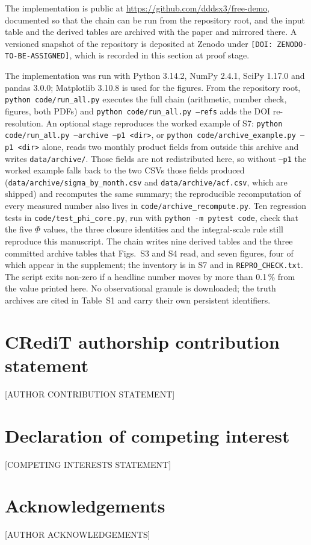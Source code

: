 \documentclass[preprint,12pt,authoryear]{elsarticle}
\begin{document}
{\sloppy The implementation is public at
\url{https://github.com/dddsx3/free-demo}, documented so that the chain can be run
from the repository root, and the input table and the derived tables are archived with the paper and mirrored there. A versioned snapshot of the repository is deposited at Zenodo under
\texttt{[DOI: ZENODO-TO-BE-\allowbreak ASSIGNED]}, which is recorded in this
section at proof stage.\par} The implementation was run with Python 3.14.2, NumPy 2.4.1, SciPy 1.17.0 and pandas 3.0.0; Matplotlib 3.10.8 is used for the figures. From the repository root, \texttt{python code/\allowbreak run\_all.py} executes the full chain (arithmetic, number check, figures, both PDFs) and \texttt{python code/\allowbreak run\_all.py --refs} adds the DOI re-resolution. An optional stage reproduces the worked example of S7: \texttt{python code/\allowbreak run\_all.py --archive --p1 <dir>}, or \texttt{python code/\allowbreak archive\_example.py --p1 <dir>} alone, reads two monthly product fields from outside this archive and writes \texttt{data/archive/}. Those fields are not redistributed here, so without \texttt{--p1} the worked example falls back to the two CSVs those fields produced (\texttt{data/archive/sigma\_by\_month.csv} and \texttt{data/archive/acf.csv}, which are shipped) and recomputes the same summary; the reproducible recomputation of every measured number also lives in \texttt{code/\allowbreak archive\_recompute.py}. Ten regression tests in \texttt{code/\allowbreak test\_phi\_core.py}, run with \texttt{python -m pytest code}, check that the five $\Phi$ values, the three closure identities and the integral-scale rule still reproduce this manuscript. The chain writes nine derived tables and the three committed archive tables that Figs.~S3 and S4 read, and seven figures, four of which appear in the supplement; the inventory is in S7 and in \texttt{REPRO\_CHECK.txt}. The script exits non-zero if a headline number moves by more than 0.1\,\% from the value printed here. No observational granule is downloaded; the truth archives are cited in Table~S1 and carry their own persistent identifiers.

\section*{CRediT authorship contribution statement}

[AUTHOR CONTRIBUTION STATEMENT]

\section*{Declaration of competing interest}

[COMPETING INTERESTS STATEMENT]

\section*{Acknowledgements}

[AUTHOR ACKNOWLEDGEMENTS]



\end{document}
